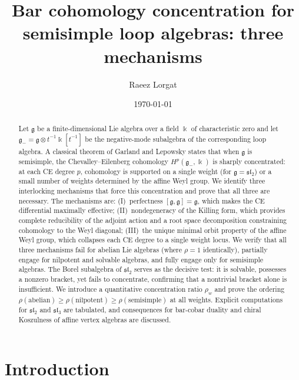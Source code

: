 \documentclass[11pt,reqno]{amsart}
\title[Bar cohomology concentration]{Bar cohomology concentration for semisimple loop algebras: three mechanisms}
\author{Raeez Lorgat}
\date{\today}
\theoremstyle{plain}
\theoremstyle{definition}
\theoremstyle{remark}
\newcommand{\fg}{\mathfrak{g}}
\newcommand{\gminus}{\fg_{-}}
\newcommand{\kk}{\Bbbk}
\begin{document}
\begin{abstract}
Let $\fg$ be a finite-dimensional Lie algebra over a field $\kk$ of
characteristic zero and let $\gminus = \fg \otimes t^{-1}\kk[t^{-1}]$ be the
negative-mode subalgebra of the corresponding loop algebra. A classical
theorem of Garland and Lepowsky states that when $\fg$ is semisimple, the
Chevalley--Eilenberg cohomology $H^p(\gminus, \kk)$ is sharply concentrated:
at each CE degree $p$, cohomology is supported on a single weight (for
$\fg = \mathfrak{sl}_2$) or a small number of weights determined by the affine
Weyl group. We identify three interlocking mechanisms that force this
concentration and prove that all three are necessary. The mechanisms are:
(I)~perfectness $[\fg,\fg] = \fg$, which makes the CE differential maximally
effective; (II)~nondegeneracy of the Killing form, which provides complete
reducibility of the adjoint action and a root space decomposition constraining
cohomology to the Weyl diagonal; (III)~the unique minimal orbit property of
the affine Weyl group, which collapses each CE degree to a single weight
locus. We verify that all three mechanisms fail for abelian Lie algebras
(where $\rho = 1$ identically), partially engage for nilpotent and solvable
algebras, and fully engage only for semisimple algebras. The Borel subalgebra
of $\mathfrak{sl}_2$ serves as the decisive test: it is solvable, possesses a
nonzero bracket, yet fails to concentrate, confirming that a nontrivial
bracket alone is insufficient. We introduce a quantitative concentration
ratio $\rho_w$ and prove the ordering $\rho(\text{abelian}) \ge
\rho(\text{nilpotent}) \ge \rho(\text{semisimple})$ at all weights. Explicit
computations for $\mathfrak{sl}_2$ and $\mathfrak{sl}_3$ are tabulated, and
consequences for bar-cobar duality and chiral Koszulness of affine vertex
algebras are discussed.
\end{abstract}

\maketitle

\setcounter{tocdepth}{2}
\tableofcontents

\section{Introduction}
\label{sec:intro}
\end{document}
